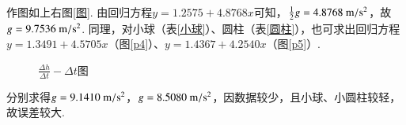 \documentclass[a4paper]{article}%
\begin{document}
作图如上右图\ref{图}.
由回归方程$y=1.2575 + 4.8768x$可知，$\frac{1}{2}g=4.8768~\text m/\text s^2$，故$g=9.7536~\text m/\text s^2$.
同理，对小球（表\ref{小球}）、圆柱（表\ref{圆柱}），也可求出回归方程$y=1.3491 + 4.5705 x$（图\ref{p4}）、$y=1.4367 + 4.2540 x$（图\ref{p5}）.
\begin{figure}[H]%
    \centering%
    \quad
    \caption{$\frac{\Delta h}{\Delta t}-\Delta t$图}%
\end{figure}
分别求得$g=9.1410~\text m/\text s^2$，$g=8.5080~\text m/\text s^2$，因数据较少，且小球、小圆柱较轻，故误差较大.
\end{document}
